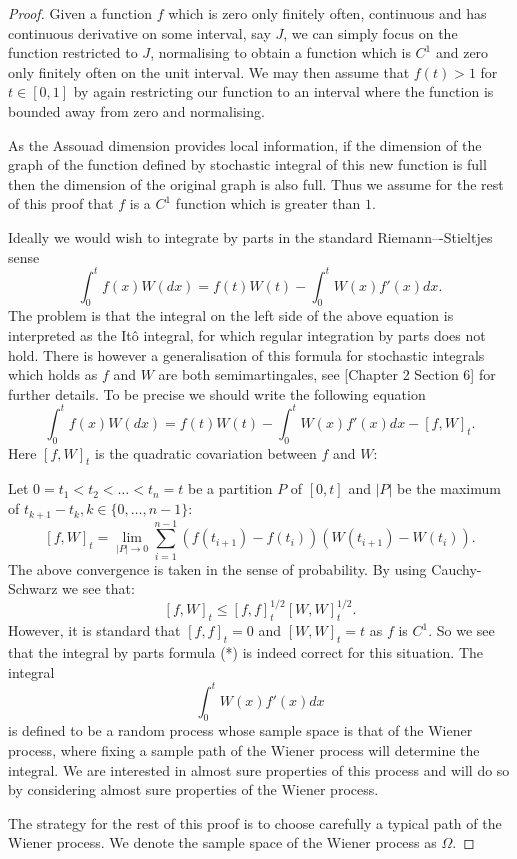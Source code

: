 \begin{proof}
	Given a function $f$ which is zero only finitely often, continuous and has continuous derivative on some interval, say $J$, we can simply focus on the function restricted to $J$, normalising to obtain a function which is $C^1$ and zero only finitely often on the unit interval. We may then assume that $f(t)>1$ for $t\in [0,1]$ by again restricting our function to an interval where the function is bounded away from zero and normalising. 
	
	As the Assouad dimension provides local information, if the dimension of the graph of the function defined by stochastic integral of this new function is full then the dimension of the original graph is also full. Thus we assume for the rest of this proof that $f$ is a $C^1$ function which is greater than $1$.
	
	Ideally we would wish to integrate by parts in the standard Riemann–-Stieltjes sense
	\[
	\int_{0}^{t}f(x)W(dx)=f(t)W(t)-\int_{0}^{t}W(x)f'(x)dx.\tag{*}
	\]
	The problem is that the integral on the left side of the above equation is interpreted as the It\^{o} integral, for which regular integration by parts does not hold. There is however a generalisation of this formula for stochastic integrals which holds as $f$ and $W$ are both semimartingales, see \cite{Pr}[Chapter 2 Section 6] for further details. To be precise we should write the following equation
	\[
	\int_{0}^{t}f(x)W(dx)=f(t)W(t)-\int_{0}^{t}W(x)f'(x)dx-[f,W]_t.
	\]
	Here $[f,W]_t$ is the quadratic covariation between $f$ and $W$:
	
	Let $0=t_1<t_2<\dots<t_n=t$ be a partition $P$ of $[0,t]$ and $\vert P \vert$ be the maximum of $t_{k+1}-t_k,k\in\{0,\dots,n-1\}$:
	\[
	[f,W]_t=\lim_{\vert P\vert\to 0} \sum_{i=1}^{n-1} (f(t_{i+1})-f(t_{i}))(W(t_{i+1})-W(t_i)).
	\]
	The above convergence is taken in the sense of probability. By using Cauchy-Schwarz we see that:
	\[
	[f,W]_t\leq [f,f]^{1/2}_t[W,W]^{1/2}_t.
	\]
	However, it is standard that $[f,f]_t=0$ and $[W,W]_t=t$ as $f$ is $C^1$. So we see that the integral by parts formula (*) is indeed correct for this situation. The integral 
	\[
	\int_0^{t} W(x)f'(x)dx
	\]
	is defined to be a random process whose sample space is that of the Wiener process, where fixing a sample path of the Wiener process will determine the integral. We are interested in almost sure properties of this process and will do so by considering almost sure properties of the Wiener process.
	
	The strategy for the rest of this proof is to choose carefully a typical path of the Wiener process. We denote the sample space of the Wiener process as $\Omega$.
	

\end{proof}
